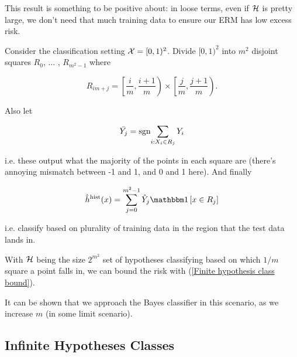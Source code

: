 \documentclass[11pt]{scrartcl}
\begin{document}
This result is something to be positive about: in loose terms, even if $\mathcal{H}$ is pretty large, we don't need that much training data to ensure our ERM has low excess risk.

\begin{example}
\label{the histogram classifier}
Consider the classification setting $\mathcal{X} = [0,1)^2$. Divide $[0,1)^2$ into $m^2$ disjoint squares $R_0$, ... , $R_{m^2-1}$ where

\begin{equation}
    R_{im + j} = \left[ \frac{i}{m}, \frac{i+1}{m} \right) \times \left[ \frac{j}{m}, \frac{j+1}{m} \right).
\end{equation}

Also let 

\begin{equation}
    \bar{Y_j} = \text{sgn}{\sum_{i: X_i \in R_j} Y_i}
\end{equation}

i.e. these output what the majority of the points in each square are (there's annoying mismatch between -1 and 1, and 0 and 1 here). And finally

\begin{equation}
    \hat{h}^\text{hist}(x) = \sum_{j=0}^{m^2-1} \hat{Y}_j \one{x \in R_j}
\end{equation}

i.e. classify based on plurality of training data in the region that the test data lands in.


With $\mathcal{H}$ being the size $2^{m^2}$ set of hypotheses classifying based on which $1/m$ square a point falls in, we can bound the risk with (\ref{Finite hypothesis class bound}).

It can be shown that we approach the Bayes classifier in this scenario, as we increase $m$ (in some limit scenario).
\end{example}

\subsection{Infinite Hypotheses Classes}
\end{document}
